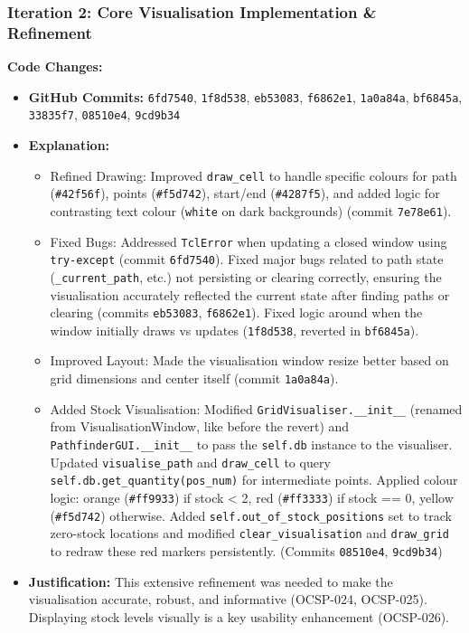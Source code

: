 \newpage

\subsubsection{Iteration 2: Core Visualisation Implementation \& Refinement}

\textbf{Code Changes:}
\begin{itemize}
	\item \textbf{GitHub Commits:} \verb|6fd7540|, \verb|1f8d538|, \verb|eb53083|, \verb|f6862e1|, \verb|1a0a84a|, \verb|bf6845a|, \verb|33835f7|, \verb|08510e4|, \verb|9cd9b34|
	\item \textbf{Explanation:}
	\begin{itemize}
		\item Refined Drawing: Improved \verb|draw_cell| to handle specific colours for path (\verb|#42f56f|), points (\verb|#f5d742|), start/end (\verb|#4287f5|), and added logic for contrasting text colour (\verb|white| on dark backgrounds) (commit \verb|7e78e61|).
		\item Fixed Bugs: Addressed \verb|TclError| when updating a closed window using \verb|try-except| (commit \verb|6fd7540|). Fixed major bugs related to path state (\verb|_current_path|, etc.) not persisting or clearing correctly, ensuring the visualisation accurately reflected the current state after finding paths or clearing (commits \verb|eb53083|, \verb|f6862e1|). Fixed logic around when the window initially draws vs updates (\verb|1f8d538|, reverted in \verb|bf6845a|).
		\item Improved Layout: Made the visualisation window resize better based on grid dimensions and center itself (commit \verb|1a0a84a|).
		\item Added Stock Visualisation: Modified \verb|GridVisualiser.__init__| (renamed from VisualisationWindow, like before the revert) and \verb|PathfinderGUI.__init__| to pass the \verb|self.db| instance to the visualiser. Updated \verb|visualise_path| and \verb|draw_cell| to query \verb|self.db.get_quantity(pos_num)| for intermediate points. Applied colour logic: orange (\verb|#ff9933|) if stock < 2, red (\verb|#ff3333|) if stock == 0, yellow (\verb|#f5d742|) otherwise. Added \verb|self.out_of_stock_positions| set to track zero-stock locations and modified \verb|clear_visualisation| and \verb|draw_grid| to redraw these red markers persistently. (Commits \verb|08510e4|, \verb|9cd9b34|)
	\end{itemize}
	\item \textbf{Justification:} This extensive refinement was needed to make the visualisation accurate, robust, and informative (OCSP-024, OCSP-025). Displaying stock levels visually is a key usability enhancement (OCSP-026).
\end{itemize}

